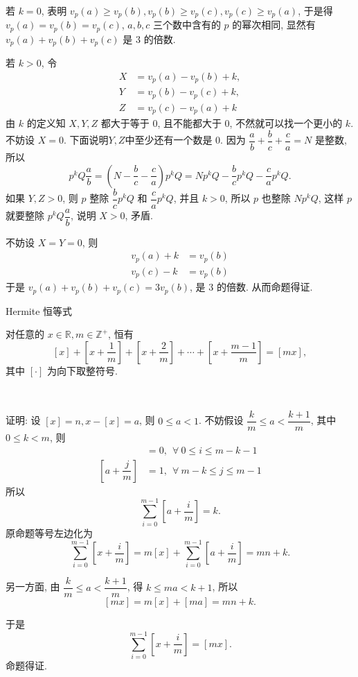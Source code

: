 若 $k = 0$, 表明 $v_p(a) \ge v_p(b), v_p(b) \ge v_p(c), v_p(c) \ge v_p(a)$, 于是得 $v_p(a) = v_p(b) = v_p(c)$, $a,b,c$ 三个数中含有的 $p$ 的幂次相同, 显然有 $v_p(a) + v_p(b) + v_p(c)$ 是 $3$ 的倍数.

若 $k > 0$, 令 
\begin{align*}
X &= v_p(a) - v_p(b) + k, \\
Y &= v_p(b) - v_p(c) + k, \\
Z &= v_p(c) - v_p(a) + k
\end{align*} 
由 $k$ 的定义知 $X,Y,Z$ 都大于等于 0, 且不能都大于 0, 不然就可以找一个更小的 $k$. 不妨设 $X = 0$. 下面说明$Y,Z$中至少还有一个数是 0. 因为 $\dfrac{a}{b}+\dfrac{b}{c}+\dfrac{c}{a} = N$ 是整数, 所以 
\[ p^kQ\frac{a}{b} = (N - \frac{b}{c} - \frac{c}{a})p^kQ = Np^kQ - \frac{b}{c}p^kQ - \frac{c}{a}p^kQ .\]
如果 $Y,Z > 0$, 则 $p$ 整除 $\dfrac{b}{c}p^kQ$ 和 $\dfrac{c}{a}p^kQ$, 并且 $k > 0$, 所以 $p$ 也整除 $Np^kQ$, 这样 $p$ 就要整除 $p^kQ\dfrac{a}{b}$, 说明 $X > 0$, 矛盾.

不妨设 $X = Y = 0$, 则 
\begin{align*}
v_p(a) + k &= v_p(b) \\
v_p(c) - k &= v_p(b) 
\end{align*}
于是 $v_p(a) + v_p(b) + v_p(c) = 3v_p(b)$, 是 $3$ 的倍数. 从而命题得证.


\newpage
\noindent Hermite 恒等式

对任意的 $x\in\mathbb{R}, m\in\mathbb{Z}^+$, 恒有
\[ [x]+[x+\frac{1}{m}]+[x+\frac{2}{m}]+\cdots+[x+\frac{m-1}{m}]=[mx], \]
其中 $[\cdot]$ 为向下取整符号.

~

证明: 设 $[x] = n, x - [x] = a$, 则 $0 \le a < 1$. 不妨假设 $\dfrac{k}{m}\le a <\dfrac{k+1}{m}$, 其中$0\le k < m$, 则 
\begin{align*}
[a + \dfrac{i}{m}] &= 0, \ \ \forall\ 0\le i\le m - k - 1\\
[a + \dfrac{j}{m}] &= 1, \ \ \forall\ m - k \le j \le m - 1
\end{align*}
所以
\[\sum_{i=0}^{m-1} [a+\frac{i}{m}] = k .\]
原命题等号左边化为
\[\sum_{i=0}^{m-1}[x + \frac{i}{m}] = m[x] + \sum_{i=0}^{m-1}[a + \frac{i}{m}] = mn + k .\]

另一方面, 由 $\dfrac{k}{m}\le a <\dfrac{k+1}{m}$, 得 $ k \le ma < k + 1$, 所以 
\[[mx] = m[x] + [ma] = mn + k .\]

于是
\[ \sum_{i=0}^{m-1}[x + \frac{i}{m}] = [mx] .\]
命题得证.

